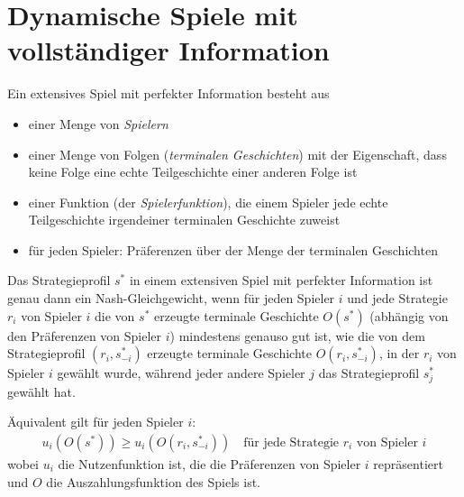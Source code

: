 \section{Dynamische Spiele mit vollständiger Information}%
\label{sec:dynamische_spiele_mit_vollstandiger_information}

\begin{definition}
  Ein extensives Spiel mit perfekter Information besteht aus
  \begin{itemize}
    \item einer Menge von \emph{Spielern}
    \item einer Menge von Folgen (\emph{terminalen Geschichten}) mit der Eigenschaft, dass
      keine Folge eine echte Teilgeschichte einer anderen Folge ist
    \item einer Funktion (der \emph{Spielerfunktion}), die einem Spieler jede echte
      Teilgeschichte irgendeiner terminalen Geschichte zuweist
    \item für jeden Spieler: Präferenzen über der Menge der terminalen Geschichten
  \end{itemize}
\end{definition}

\begin{definition}
  Das Strategieprofil $s^*$ in einem extensiven Spiel mit perfekter Information ist genau
  dann ein Nash-Gleichgewicht, wenn für jeden Spieler $i$ und jede Strategie $r_i$ von
  Spieler $i$ die von $s^*$ erzeugte terminale Geschichte $O(s^*)$ (abhängig von den
  Präferenzen von Spieler $i$) mindestens genauso gut ist, wie die von dem Strategieprofil
  $(r_i, s^*_{-i})$ erzeugte terminale Geschichte $O(r_i, s^*_{-i})$, in der $r_i$ von
  Spieler $i$ gewählt wurde, während jeder andere Spieler $j$ das Strategieprofil $s^*_j$
  gewählt hat.

  Äquivalent gilt für jeden Spieler $i$:
  \begin{align*}
    u_i(O(s^*)) \geq u_i(O(r_i, s^*_{-i})) \quad
      \text{für jede Strategie $r_i$ von Spieler $i$}
  \end{align*}
  wobei $u_i$ die Nutzenfunktion ist, die die Präferenzen von Spieler $i$ repräsentiert
  und $O$ die Auszahlungsfunktion des Spiels ist.
\end{definition}
